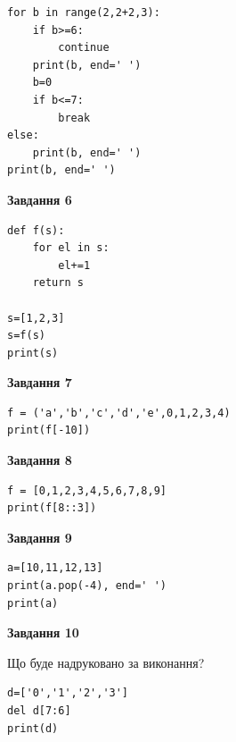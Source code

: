 \documentclass[12pt, ukrainian]{article}
\begin{document}
{{{{{\begin{minipage}[t]{10.5cm}
\begin{verbatim}
for b in range(2,2+2,3):
    if b>=6:
        continue
    print(b, end=' ')
    b=0
    if b<=7:
        break
else:
    print(b, end=' ')
print(b, end=' ')
\end{verbatim}



\begin{center}
\textbf{Завдання 6}
\end{center}

\begin{verbatim}
def f(s):
    for el in s:
        el+=1
    return s

s=[1,2,3]
s=f(s)
print(s)
\end{verbatim}



\begin{center}
\textbf{Завдання 7}
\end{center}

\begin{verbatim}
f = ('a','b','c','d','e',0,1,2,3,4)
print(f[-10])
\end{verbatim}



\begin{center}
\textbf{Завдання 8}
\end{center}

\begin{verbatim}
f = [0,1,2,3,4,5,6,7,8,9]
print(f[8::3])
\end{verbatim}



\begin{center}
\textbf{Завдання 9}
\end{center}

\begin{verbatim}
a=[10,11,12,13]
print(a.pop(-4), end=' ')
print(a)
\end{verbatim}



\begin{center}
\textbf{Завдання 10}
\end{center}
Що буде надруковано за виконання?\par
\begin{verbatim}
d=['0','1','2','3']
del d[7:6]
print(d)
\end{verbatim}

\end{minipage}

}
\newpage

}}}}
\end{document}
